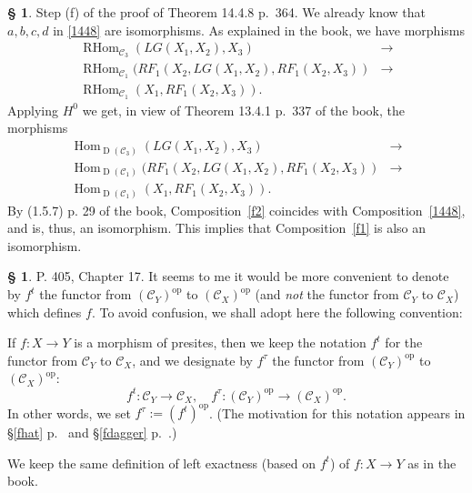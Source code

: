 \documentclass[12pt]{article}
\theoremstyle{remark}
\theoremstyle{definition}
\newtheorem{s}[thm]{\S}
\newcommand{\C}{\mathcal C}
\newcommand{\oo}{\operatorname}
\DeclareMathOperator{\op}{op}
\begin{document}
%
%
\begin{s}\label{1448f}
Step (f) of the proof of Theorem 14.4.8 p.~364. We already know that $a,b,c,d$ in \eqref{1448} are isomorphisms. As explained in the book, we have morphisms  
\begin{equation}\label{f1}
\begin{split}
\oo{RHom}_{\C_3}(LG(X_1,X_2),X_3)&\to\\ 
\oo{RHom}_{\C_1}(RF_1(X_2,LG(X_1,X_2),RF_1(X_2,X_3))&\to\\ 
\oo{RHom}_{\C_1}(X_1,RF_1(X_2,X_3)).
\end{split}
\end{equation}
Applying $H^0$ we get, in view of Theorem 13.4.1 p.~337 of the book, the morphisms 
\begin{equation}\label{f2}
\begin{split}
\oo{Hom}_{\oo D(\C_3)}(LG(X_1,X_2),X_3)&\to\\ 
\oo{Hom}_{\oo D(\C_1)}(RF_1(X_2,LG(X_1,X_2),RF_1(X_2,X_3))&\to\\ 
\oo{Hom}_{\oo D(\C_1)}(X_1,RF_1(X_2,X_3)).
\end{split}
\end{equation}
By (1.5.7) p. 29 of the book, Composition~\eqref{f2} coincides with Composition~\eqref{1448}, and is, thus, an isomorphism. This implies that Composition~\eqref{f1} is also an isomorphism.
\end{s}
%
%
\begin{s}\label{revol}
P. 405, Chapter 17. It seems to me it would be more convenient to denote by $f^t$ the functor from $(\C_Y)^{\op}$ to $(\C_X)^{\op}$ (and {\em not} the functor from $\C_Y$ to $\C_X$) which defines $f$. To avoid confusion, we shall adopt here the following convention:

If $f:X\to Y$ is a morphism of presites, then we keep the notation $f^t$ for the functor from $\C_Y$ to $\C_X$, and we designate by $f^\tau$ the functor from $(\C_Y)^{\op}$ to $(\C_X)^{\op}$:
\begin{equation}\label{ttau}
f^t:\C_Y\to\C_X,\quad f^\tau:(\C_Y)^{\op}\to(\C_X)^{\op}.
\end{equation}
In other words, we set $f^\tau:=(f^t)^{\op}$. (The motivation for this notation appears in \S\ref{fhat} p.~\pageref{fhat} and \S\ref{fdagger} p.~\pageref{fdagger}.)

We keep the same definition of left exactness (based on $f^t$) of $f:X\to Y$ as in the book.
\end{s}
%
%
\end{document}
